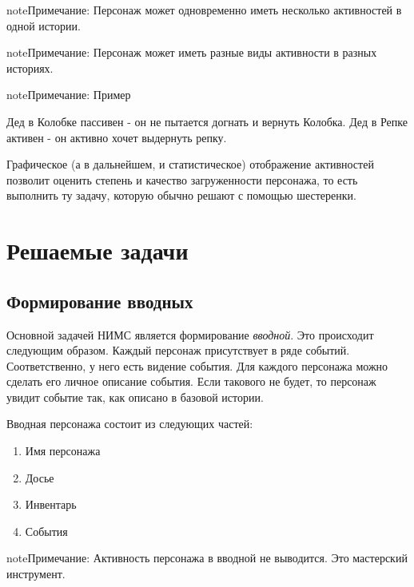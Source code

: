 \documentclass[a4paper,oneside,10pt,russian]{sphinxmanual}
\begin{document}
\begin{notice}{note}{Примечание:}
Персонаж может одновременно иметь несколько активностей в одной истории.
\end{notice}

\begin{notice}{note}{Примечание:}
Персонаж может иметь разные виды активности в разных историях.
\end{notice}

\begin{notice}{note}{Примечание:}
Пример

Дед в Колобке пассивен - он не пытается догнать и вернуть Колобка. Дед в Репке активен - он активно хочет выдернуть репку.
\end{notice}

Графическое (а в дальнейшем, и статистическое) отображение активностей позволит оценить степень и качество загруженности персонажа, то есть выполнить ту задачу, которую обычно решают с помощью шестеренки.


\chapter{Решаемые задачи}
\label{tasks::doc}\label{tasks:id1}

\section{Формирование вводных}
\label{tasks:id2}
Основной задачей НИМС является формирование \emph{вводной}. Это происходит следующим образом. Каждый персонаж присутствует в ряде событий. Соответственно, у него есть видение события. Для каждого персонажа можно сделать его личное описание события. Если такового не будет, то персонаж увидит событие так, как описано в базовой истории.

Вводная персонажа состоит из следующих частей:
\begin{enumerate}
\item {}
Имя персонажа

\item {}
Досье

\item {}
Инвентарь

\item {}
События

\end{enumerate}

\begin{notice}{note}{Примечание:}
Активность персонажа в вводной не выводится. Это мастерский инструмент.
\end{notice}
\end{document}
